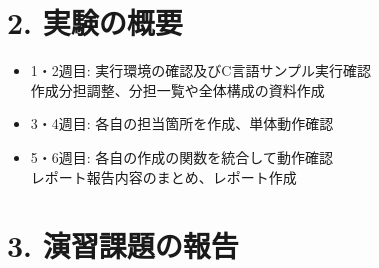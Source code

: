 \documentclass[a4paper,11pt]{jsarticle}
\begin{document}
\section*{2. 実験の概要}
\begin{itemize}[left=2em]
    \item 1・2週目: 実行環境の確認及びC言語サンプル実行確認 \\
    作成分担調整、分担一覧や全体構成の資料作成
    \item 3・4週目: 各自の担当箇所を作成、単体動作確認
    \item 5・6週目: 各自の作成の関数を統合して動作確認 \\
    レポート報告内容のまとめ、レポート作成
\end{itemize}


\section*{3. 演習課題の報告}
\end{document}
